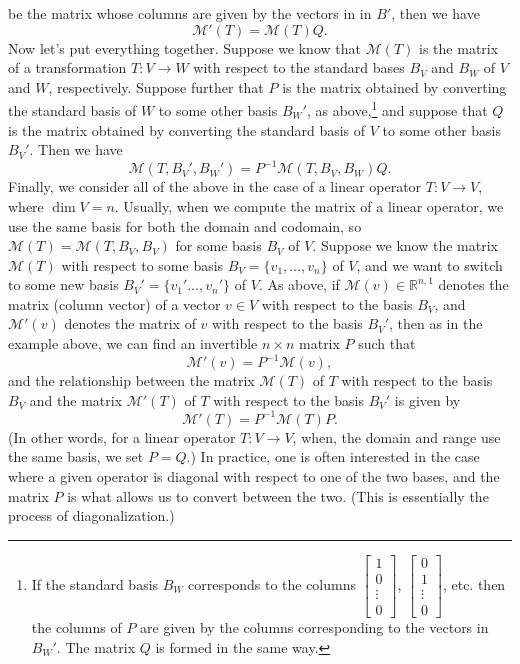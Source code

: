 \documentclass[12pt,letterpaper]{article}
\newcommand{\M}{\mathcal{M}}
\newcommand{\R}{\mathbb{R}}
\begin{document}
be the matrix whose columns are given by the vectors in in $B'$, then we have
\[
\M'(T) = \M(T)Q.
\]
Now let's put everything together. Suppose we know that $\M(T)$ is the matrix of a transformation $T:V\to W$ with respect to the standard bases $B_V$ and $B_W$ of $V$ and $W$, respectively. Suppose further that $P$ is the matrix obtained by converting the standard basis of $W$ to some other basis $B_W'$, as above,\footnote{If the standard basis $B_W$ corresponds to the columns $\begin{bmatrix}1\\0\\\vdots \\0\end{bmatrix}$, $\begin{bmatrix}0\\1\\\vdots\\0\end{bmatrix}$, etc. then the columns of $P$ are given by the columns corresponding to the vectors in $B_W'$. The matrix $Q$ is formed in the same way.} and suppose that $Q$ is the matrix obtained by converting the standard basis of $V$ to some other basis $B_V'$. Then we have
\[
\M(T,B_V',B_W') = P^{-1}\M(T,B_V,B_W)Q.
\]
Finally, we consider all of the above in the case of a linear operator $T:V\to V$, where $\dim V=n$. Usually, when we compute the matrix of a linear operator, we use the same basis for both the domain and codomain, so $\M(T) = \M(T,B_V,B_V)$ for some basis $B_V$ of $V$. Suppose we know the matrix $\M(T)$ with respect to some basis $B_V=\{v_1,\ldots, v_n\}$ of $V$, and we want to switch to some new basis $B_V'=\{v_1'\ldots, v_n'\}$ of $V$. As above, if $\M(v)\in\R^{n,1}$ denotes the matrix (column vector) of a vector $v\in V$ with respect to the basis $B_V$, and $\M'(v)$ denotes the matrix of $v$ with respect to the basis $B_V'$, then as in the example above, we can find an invertible $n\times n$ matrix $P$ such that
\[
\M'(v) = P^{-1}\M(v),
\]
and the relationship between the matrix $\M(T)$ of $T$ with respect to the basis $B_V$ and the matrix $\M'(T)$ of $T$ with respect to the basis $B_V'$ is given by
\[
\M'(T) = P^{-1}\M(T)P.
\]
(In other words, for a linear operator $T:V\to V$, when, the domain and range use the same basis, we set $P=Q$.) In practice, one is often interested in the case where a given operator is diagonal with respect to one of the two bases, and the matrix $P$ is what allows us to convert between the two. (This is essentially the process of diagonalization.)
\end{document}
